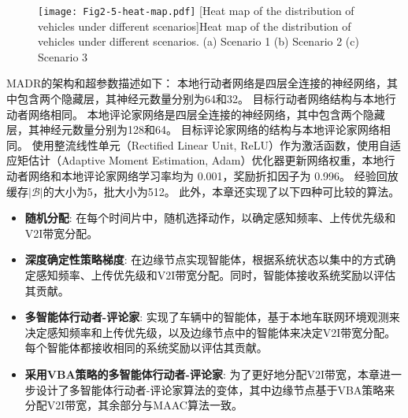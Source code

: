\begin{figure}[h]
\centering
  \texttt{[image: Fig2-5-heat-map.pdf]}
  [Heat map of the distribution of vehicles under different scenarios]{Heat map of the distribution of vehicles under different scenarios. (a) Scenario 1 (b) Scenario 2 (c) Scenario 3}
  \label{fig 2-5}
\end{figure} 

MADR的架构和超参数描述如下：
本地行动者网络是四层全连接的神经网络，其中包含两个隐藏层，其神经元数量分别为64和32。
目标行动者网络结构与本地行动者网络相同。
本地评论家网络是四层全连接的神经网络，其中包含两个隐藏层，其神经元数量分别为128和64。
目标评论家网络的结构与本地评论家网络相同。
使用整流线性单元（Rectified Linear Unit, ReLU）作为激活函数，使用自适应矩估计（Adaptive Moment Estimation, Adam）优化器更新网络权重，本地行动者网络和本地评论家网络学习率均为 0.001，奖励折扣因子为 0.996。
经验回放缓存$|\mathcal{B}|$的大小为5，批大小为512。
此外，本章还实现了以下四种可比较的算法。

\begin{itemize}
	\item \textbf{随机分配}: 在每个时间片中，随机选择动作，以确定感知频率、上传优先级和V2I带宽分配。
	\item \textbf{深度确定性策略梯度}\cite{mlika2022deep}: 在边缘节点实现智能体，根据系统状态以集中的方式确定感知频率、上传优先级和V2I带宽分配。同时，智能体接收系统奖励以评估其贡献。
	\item \textbf{多智能体行动者-评论家}\cite{he2021efficient}: 实现了车辆中的智能体，基于本地车联网环境观测来决定感知频率和上传优先级，以及边缘节点中的智能体来决定V2I带宽分配。每个智能体都接收相同的系统奖励以评估其贡献。
	\item \textbf{采用VBA策略的多智能体行动者-评论家}: 为了更好地分配V2I带宽，本章进一步设计了多智能体行动者-评论家算法的变体，其中边缘节点基于VBA策略来分配V2I带宽，其余部分与MAAC算法一致。
\end{itemize}

